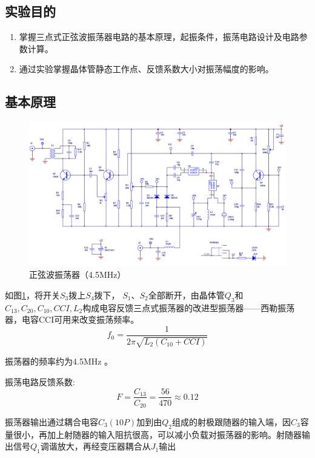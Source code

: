\documentclass[12pt]{article}%
\numberwithin{equation}{section}
\begin{document}
\subsection{实验目的}
\begin{enumerate}\addtolength{\itemsep}{-1.5ex}

\item 掌握三点式正弦波振荡器电路的基本原理，起振条件，振荡电路设计及电路参数计算。
\item 通过实验掌握晶体管静态工作点、反馈系数大小对振荡幅度的影响。
\end{enumerate}

\subsection{基本原理}
\begin{figure}[ht]
  \centering
  \includegraphics[width=\textwidth]{image001.png} 
  \caption{ 正弦波振荡器（4.5MHz）} 
  \label{img1} 
\end{figure}

如图\ref{img1}，将开关$S_3$拨上$S_4$拨下， $S_1$、$S_2$全部断开，由晶体管$Q_3$和$C_{13},C_{20},C_{10},CCI,L_2$构成电容反馈三点式振荡器的改进型振荡器——西勒振荡器，电容CCI可用来改变振荡频率。
\begin{equation}
f_0=\frac{1}{2\pi\sqrt{L_2(C_{10}+CCI)}}
\end{equation} \par
振荡器的频率约为4.5MHz 。\par
振荡电路反馈系数:
\begin{equation}
F=\frac{C_{13}}{C_{20}}=\frac{56}{470}\approx 0.12
\end{equation} \par
振荡器输出通过耦合电容$C_3(10P)$加到由$Q_2$组成的射极跟随器的输入端，因$C_3$容量很小，再加上射随器的输入阻抗很高，可以减小负载对振荡器的影响。射随器输出信号$Q_1$调谐放大，再经变压器耦合从$J_1$输出
\end{document}
